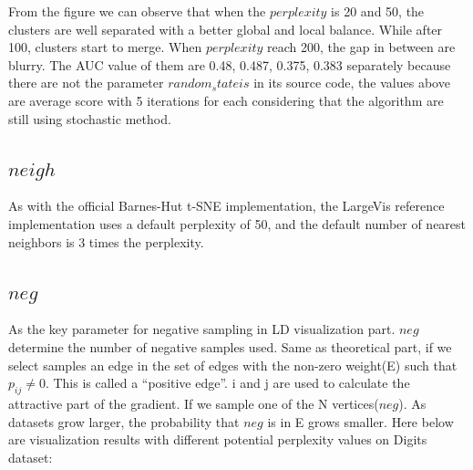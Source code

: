 \noindent From the figure we can observe that when the $perplexity$ is 20 and 50, the clusters are well separated with a better global and local balance. While after 100, clusters start to merge. When $perplexity$ reach 200, the gap in between are blurry. The AUC value of them are 0.48, 0.487, 0.375, 0.383 separately because there are not the parameter $random_stateis$ in its source code, the values above are average score with 5 iterations for each considering that the algorithm are still using stochastic method.

\subsection{$neigh$}
As with the official Barnes-Hut t-SNE implementation, the LargeVis reference implementation uses a default perplexity of 50, and the default number of nearest neighbors is 3 times the perplexity. 

\subsection{$neg$}

As the key parameter for negative sampling in LD visualization part. $neg$ determine the number of negative samples used. Same as theoretical part, if we select samples an edge in the set of edges with the non-zero weight(E) such that $p_{ij} \neq 0$. This is called a “positive edge”. i and j are used to calculate the attractive part of the gradient. If we sample one of the N vertices($neg$). As datasets grow larger, the probability that $neg$ is in E grows smaller. Here below are visualization results with different potential perplexity values on Digits dataset: 

